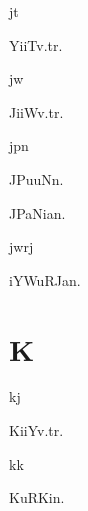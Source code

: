 \begin{multicols*}{2}
\begin{dictroot}{j}{t}
    \begin{dictentry}{YiiT}{v.tr.}
    \end{dictentry}
\end{dictroot}

\begin{dictroot}{j}{w}
    \begin{dictentry}{JiiW}{v.tr.}
    \end{dictentry}
\end{dictroot}

\begin{dictroot}{jp}{n}
    \begin{dictentry}{JPuuN}{n.}
    \end{dictentry}
    \begin{dictentry}{JPaNia}{n.}
    \end{dictentry}
\end{dictroot}

\begin{dictroot}{jw}{rj}
    \begin{dictentry}{iYWuRJa}{n.}
    \end{dictentry}
\end{dictroot}

\section*{K}

\begin{dictroot}{k}{j}
    \begin{dictentry}{KiiY}{v.tr.}
    \end{dictentry}
\end{dictroot}

\begin{dictroot}{k}{k}
    \begin{dictentry}{KuRKi}{n.}
    \end{dictentry}
\end{dictroot}


\end{multicols*}
